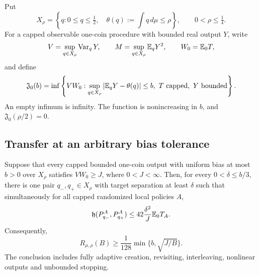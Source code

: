 Put
\[
 X_\rho=\left\{q:0\le q\le\tfrac12,\quad
                  \theta(q):=\int q\,d\mu\le\rho\right\},
 \qquad 0<\rho\le\tfrac14.
\]
For a capped observable one-coin procedure with bounded real output \(Y\),
write
\[
 V=\sup_{q\in X_\rho}\operatorname{Var}_qY,\qquad
 M=\sup_{q\in X_\rho}\mathbb E_qY^2,\qquad W_0=\mathbb E_0T,
\]
and define
\begin{equation}
 \mathfrak J_0(b)=\inf\left\{VW_0:
       \sup_{q\in X_\rho}|\mathbb E_qY-\theta(q)|\le b,
       \ T\text{ capped},\ Y\text{ bounded}\right\}.
 \label{eq:null-bias-complexity}
\end{equation}
An empty infimum is infinity.  The function is nonincreasing in \(b\),
and \(\mathfrak J_0(\rho/2)=0\).

\subsection{Transfer at an arbitrary bias tolerance}

\begin{theorem}
\label{thm:bias-transfer}
Suppose that every capped bounded one-coin output with uniform bias at
most \(b>0\) over \(X_\rho\) satisfies \(VW_0\ge J\), where
\(0<J<\infty\).  Then, for every \(0<\delta\le b/3\), there is one pair
\(q_-,q_+\in X_\rho\) with target separation at least \(\delta\) such
that simultaneously for all capped randomized local policies \(A\),
\begin{equation}
 \mathfrak h(P_{q_-}^A,P_{q_+}^A)
 \le42\frac{\delta^2}{J}\mathbb E_0T_A.
 \label{eq:bias-common-pair}
\end{equation}
Consequently,
\begin{equation}
 R_{\mu,\rho}(B)\ge\frac1{128}
                 \min\{b,\sqrt{J/B}\}.
 \label{eq:bias-population-transfer}
\end{equation}
The conclusion includes fully adaptive creation, revisiting, interleaving,
nonlinear outputs and unbounded stopping.
\end{theorem}

